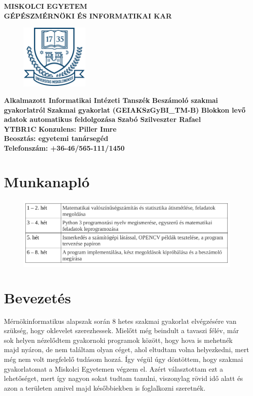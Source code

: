 \documentclass[a4paper,12pt]{article}
\begin{document}
\begin{center}
	\Large \textbf{MISKOLCI EGYETEM}
	\\
	\Large \textbf{GÉPÉSZMÉRNÖKI ÉS INFORMATIKAI KAR}
	\vskip 1cm
	\begin{figure}[h]
		\centering
		\includegraphics[width=0.3\textwidth]{logo}
	\end{figure}
	\Large \textbf{Alkalmazott Informatikai Intézeti Tanszék}
	\vskip 1cm
	\huge \textbf{Beszámoló szakmai gyakorlatról}
	\vskip 1cm
	\Large \textbf{Szakmai gyakorlat (GEIAKSzGyBI{\_}TM-B)}
	\vskip 1cm
	\Large \textbf{Blokkon levő adatok automatikus feldolgozása}
	\vskip 1cm
	\huge \textbf{Szabó Szilveszter Rafael}
	\\
	\LARGE \textbf{YTBR1C}
	\vskip 1cm
	\large \textbf{Konzulens: Piller Imre}
	\\
	\large \textbf{Beosztás: egyetemi tanársegéd}
	\\
	\large \textbf{Telefonszám: +36-46/565-111/1450}

\end{center}

\newpage
\tableofcontents

\newpage 
\section{Munkanapló}
\begin{figure}[h]
	\centering
	\includegraphics[width=16cm]{munka}
	
\end{figure}

\newpage
\section{Bevezetés}
Mérnökinformatikus alapszak során 8 hetes szakmai gyakorlat elvégzésére van szükség, hogy  oklevelet szerezhessek. Mielőtt még beindult a tavaszi félév, már sok helyen nézelődtem gyakornoki programok között, hogy hova is mehetnék majd nyáron, de nem találtam olyan céget, ahol eltudtam volna helyezkedni, mert még nem volt megfelelő tudásom hozzá. Így végül úgy döntöttem, hogy szakmai gyakorlatomat a Miskolci Egyetemen végzem el. Azért választottam ezt a lehetőséget, mert így nagyon sokat tudtam tanulni, viszonylag rövid idő alatt és azon a területen amivel majd későbbiekben is foglalkozni szeretnék. 
 
\end{document}
